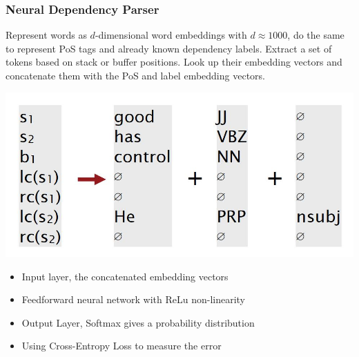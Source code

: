 \documentclass[11pt]{article}
\begin{document}
\subsubsection{Neural Dependency Parser}
Represent words as $d$-dimensional word embeddings with $d\approx 1000$, do the same to represent PoS tags and already known dependency labels. Extract a set of tokens based on stack or buffer positions. Look up their embedding vectors and concatenate them with the PoS and label embedding vectors.
\begin{center}
	\includegraphics[width=0.7\linewidth]{img/neural_dependency_parsing_vector}
\end{center}
\begin{itemize}
	\item Input layer, the concatenated embedding vectors
	\item Feedforward neural network with ReLu non-linearity
	\item Output Layer, Softmax gives a probability distribution
	\item Using Cross-Entropy Loss to measure the error
\end{itemize}
\end{document}
